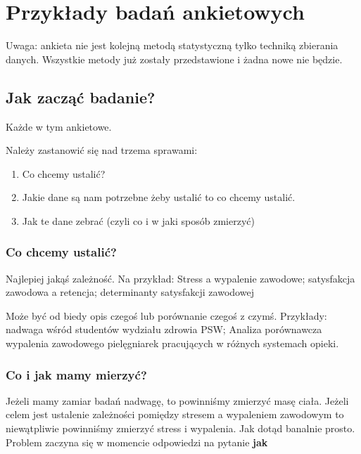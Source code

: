 \documentclass[
  openany]{book}
\providecommand{\tightlist}{%
  \setlength{\itemsep}{0pt}\setlength{\parskip}{0pt}}
\begin{document}
\hypertarget{surveyexamples}{%
\chapter{Przykłady badań ankietowych}\label{surveyexamples}}

Uwaga: ankieta nie jest kolejną metodą statystyczną tylko techniką zbierania danych.
Wszystkie metody już zostały przedstawione i żadna nowe nie będzie.

\hypertarget{jak-zaczux105ux107-badanie}{%
\section{Jak zacząć badanie?}\label{jak-zaczux105ux107-badanie}}

Każde w tym ankietowe.

Należy zastanowić się nad trzema sprawami:

\begin{enumerate}
\def\labelenumi{\arabic{enumi}.}
\tightlist
\item
  Co chcemy ustalić?
\item
  Jakie dane są nam potrzebne żeby ustalić to co chcemy ustalić.
\item
  Jak te dane zebrać (czyli co i w jaki sposób zmierzyć)
\end{enumerate}

\hypertarget{co-chcemy-ustaliux107}{%
\subsection{Co chcemy ustalić?}\label{co-chcemy-ustaliux107}}

Najlepiej jakąś zależność. Na przykład: Stress a wypalenie zawodowe;
satysfakcja zawodowa a retencja; determinanty satysfakcji zawodowej

Może być od biedy opis czegoś lub porównanie czegoś z czymś. Przykłady:
nadwaga wśród studentów wydziału zdrowia PSW; Analiza porównawcza
wypalenia zawodowego pielęgniarek
pracujących w różnych systemach opieki.

\hypertarget{co-i-jak-mamy-mierzyux107}{%
\subsection{Co i jak mamy mierzyć?}\label{co-i-jak-mamy-mierzyux107}}

Jeżeli mamy zamiar badań nadwagę, to powinniśmy zmierzyć masę ciała.
Jeżeli celem jest ustalenie zależności pomiędzy stresem a wypaleniem
zawodowym to niewątpliwie powinniśmy zmierzyć stress i wypalenia. Jak
dotąd banalnie prosto. Problem zaczyna się w momencie odpowiedzi na
pytanie \textbf{jak}
\end{document}
